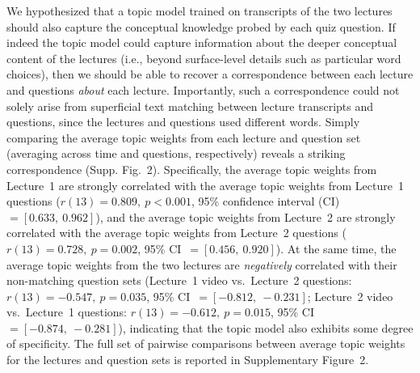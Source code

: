 \documentclass[10pt]{article}
\newcommand{\topicWeights}{2}
\begin{document}
We hypothesized that a topic model trained on transcripts of the two lectures
should also capture the conceptual knowledge probed by each quiz question. If
indeed the topic model could capture information about the deeper conceptual
content of the lectures (i.e., beyond surface-level details such as particular
word choices), then we should be able to recover a correspondence between each
lecture and questions \textit{about} each lecture. Importantly, such a
correspondence could not solely arise from superficial text matching between
lecture transcripts and questions, since the lectures and questions used
different words. Simply comparing the average topic weights from each lecture
and question set (averaging across time and questions, respectively) reveals a
striking correspondence (Supp. Fig.~\topicWeights). Specifically, the average
topic weights from Lecture~1 are strongly correlated with the average topic
weights from Lecture~1 questions ($r(13) = 0.809,~p < 0.001$, 95\% confidence
interval (CI)~$= [0.633,~0.962]$), and the average topic weights from Lecture~2
are strongly correlated with the average topic weights from Lecture~2 questions
($r(13) = 0.728,~p = 0.002$, 95\% CI~$= [0.456,~0.920]$). At the same time, the
average topic weights from the two lectures are \textit{negatively} correlated
with their non-matching question sets (Lecture~1 video vs.~Lecture~2 questions:
$r(13) = -0.547,~p = 0.035$, 95\% CI~$= [-0.812, ~-0.231]$; Lecture~2 video
vs.~Lecture~1 questions: $r(13) = -0.612,~p = 0.015$, 95\% CI~$=
[-0.874,~-0.281]$), indicating that the topic model also exhibits some degree
of specificity. The full set of pairwise comparisons between average topic
weights for the lectures and question sets is reported in Supplementary
Figure~\topicWeights.
\end{document}
